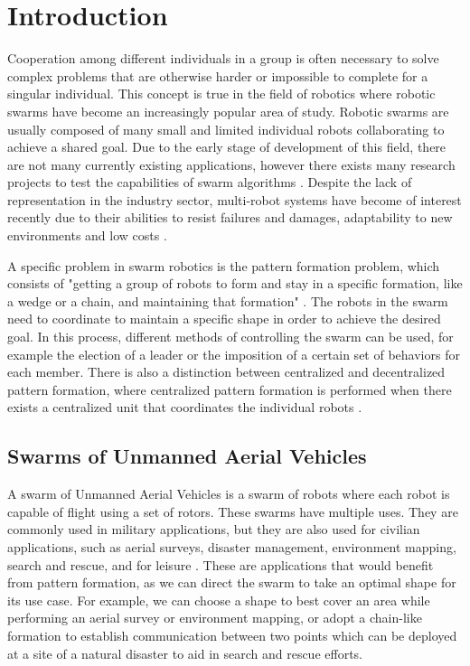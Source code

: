 \tableofcontents

\listoffigures

\listoftables

\listofalgorithms

\chapter{Introduction}

Cooperation among different individuals in a group is often necessary to solve complex problems
that are otherwise harder or impossible to complete for a singular individual. This concept is
true in the field of robotics where robotic swarms have become an increasingly popular area of study.
Robotic swarms are usually composed of many small and limited individual robots \autocite{HO17}
collaborating to achieve a shared goal.
Due to the early
stage of development of this field, there are not many currently existing applications, however
there exists many research projects to test the capabilities of swarm algorithms \autocite{MS20}.
Despite the lack of representation in the industry sector, multi-robot systems have become of
interest recently due to their abilities to resist failures and damages, adaptability to new
environments and low costs \autocite{HO17}.

A specific problem in swarm robotics is the pattern formation problem, which consists of
"getting a group of robots to form and stay in a specific formation, like a wedge or a chain,
and maintaining that formation" \autocite{LS22}. The robots in the swarm need to coordinate
to maintain a specific shape in order to achieve the desired goal. In this process, different
methods of controlling the swarm can be used, for example the election of a leader or the 
imposition of a certain set of behaviors for each member. There is also a 
distinction between centralized and decentralized pattern formation, where centralized pattern
formation is performed when there exists a centralized unit that coordinates the individual
robots \autocite{HO17}.


\section{Swarms of Unmanned Aerial Vehicles}

A swarm of Unmanned Aerial Vehicles is a swarm of robots where each robot is capable of flight using
a set of rotors. These swarms have multiple uses. They are commonly used in military applications, but
they are also used for civilian applications, such as aerial surveys, disaster management, environment
mapping, search and rescue, and for leisure \autocite{TA19}. These are applications that would benefit
from pattern formation, as we can direct the swarm to take an optimal shape for its use case. For 
example, we can choose a shape to best cover an area while performing an aerial survey or environment
mapping, or adopt a chain-like formation to establish communication between two points \autocite{MS20}
which can be deployed at a site of a natural disaster to aid in search and rescue efforts.


